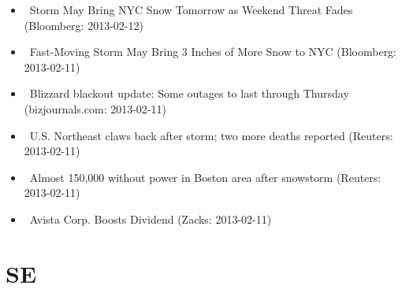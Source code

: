 \documentclass[11pt,asymmetric]{article}
\begin{document}
\begin{itemize}
\item\ Storm May Bring NYC Snow Tomorrow as Weekend Threat Fades (Bloomberg: 2013-02-12)
\item\ Fast-Moving Storm May Bring 3 Inches of More Snow to NYC (Bloomberg: 2013-02-11)
\item\ Blizzard blackout update: Some outages to last through Thursday (bizjournals.com: 2013-02-11)
\item\ U.S. Northeast claws back after storm; two more deaths reported (Reuters: 2013-02-11)
\item\ Almost 150,000 without power in Boston area after snowstorm (Reuters: 2013-02-11)
\item\ Avista Corp. Boosts Dividend (Zacks: 2013-02-11)
\end{itemize}

\section*{SE}
\end{document}

